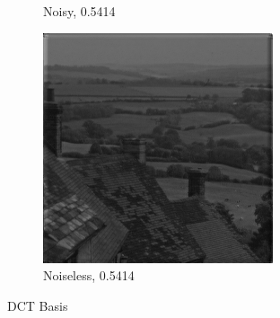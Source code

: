 \documentclass[a4paper]{article}
\begin{document}
\begin{figure}[H]
\begin{subfigure}{0.24\linewidth}
        \caption{Noisy, 0.5414}
    \end{subfigure}
    \begin{subfigure}{0.24\linewidth}
        \centering
        \includegraphics[width = \linewidth]{dct2D/goldhill reconstructed using compressive measurements, without noise.png}
        \caption{Noiseless, 0.5414}
    \end{subfigure}
    \caption{DCT Basis}
    \label{fig:dctb}
\end{figure}
\end{document}
